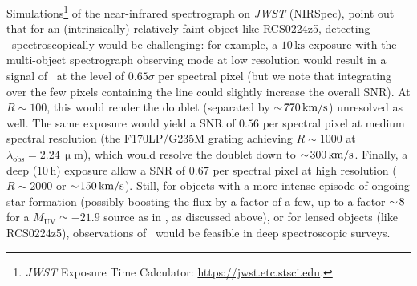 Simulations\footnote{\textit{JWST} Exposure Time Calculator: \url{https://jwst.etc.stsci.edu}.} of the near-infrared spectrograph on \textit{JWST} (NIRSpec), point out that for an (intrinsically) relatively faint object like RCS0224z5, detecting \MgII\ spectroscopically would be challenging: for example, a $10 \, \mathrm{ks}$ exposure with the multi-object spectrograph observing mode at low resolution would result in a signal of \MgII\ at the level of $0.65 \sigma$ per spectral pixel (but we note that integrating over the few pixels containing the line could slightly increase the overall SNR). At $R \sim 100$, this would render the doublet (separated by $\sim \! 770 \, \mathrm{km/s}$) unresolved as well. The same exposure would yield a SNR of $0.56$ per spectral pixel at medium spectral resolution (the F170LP/G235M grating achieving $R \sim 1000$ at $\lambda_\text{obs} = 2.24 \, \mathrm{\upmu m}$), which would resolve the doublet down to $\sim \! 300 \, \mathrm{km/s}$. Finally, a deep ($10 \, \mathrm{h}$) exposure allow a SNR of $0.67$ per spectral pixel at high resolution ($R \sim 2000$ or $\sim \! 150 \, \mathrm{km/s}$). Still, for objects with a more intense episode of ongoing star formation (possibly boosting the flux by a factor of a few, up to a factor $\sim \! 8$ for a $M_\mathrm{UV} \simeq -21.9$ source as in \citealt{2020MNRAS.498.2554C}, as discussed above), or for lensed objects (like RCS0224z5), observations of \MgII\ would be feasible in deep spectroscopic surveys.